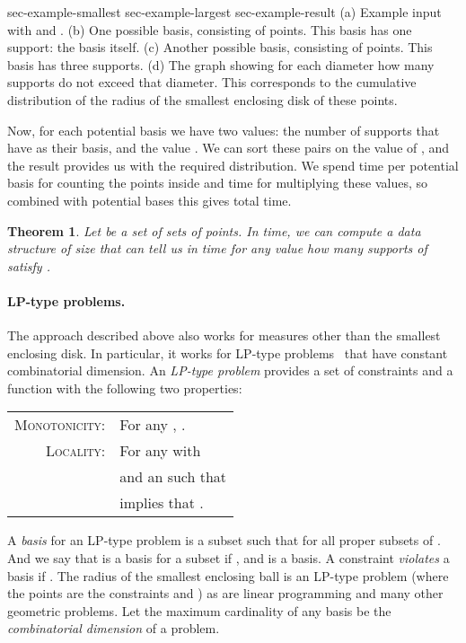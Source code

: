 \documentclass{journal}
\newcommand{\psets}{supports\xspace}
\newtheorem {theorem}{Theorem}[section]
\begin{document}
 {sec-example-smallest} {sec-example-largest} {sec-example-result}
{
  (a) Example input with  and . 
  (b) One possible basis, consisting of  points. This basis has one support: the basis itself. 
  (c) Another possible basis, consisting of  points. This basis has three \psets. 
  (d) The graph showing for each diameter  how many \psets do not exceed that diameter. This corresponds to the cumulative distribution of the radius of the smallest enclosing disk of these points.
}


Now, for each potential basis  we have two values: the number of \psets that have  as their basis, and the value . We can sort these  pairs on the value of , and the result provides us with the required distribution.
We spend  time per potential basis for counting the points inside and  time for multiplying these values,
so combined with  potential bases this gives  total time.

\begin {theorem}
Let  be a set of  sets of  points.
In  time, we can compute a data structure of  size that can tell us in  time for any value  how many \psets of  satisfy .
\end {theorem}



\paragraph{LP-type problems.}

The approach described above also works for measures  other than the smallest enclosing disk.  In particular, it works for LP-type problems~\cite{SW92} that have constant combinatorial dimension.
An \emph{LP-type problem} provides a set of constraints  and a function  with the following two properties:

\begin{tabular} {rl} \textsc{Monotonicity:} & For any , .\\
\textsc{Locality:} & For any  with \\ &and an  such that \\ &implies that .\\
\end{tabular}

A \emph{basis} for an LP-type problem is a subset  such that  for all proper subsets  of .  And we say that  is a basis for a subset  if ,  and  is a basis.  A constraint  \emph{violates} a basis  if .
The radius of the smallest enclosing ball is an LP-type problem (where the points are the constraints and ) as are linear programming and many other geometric problems.
Let the maximum cardinality of any basis be the \emph{combinatorial dimension} of a problem.  
\end{document}
